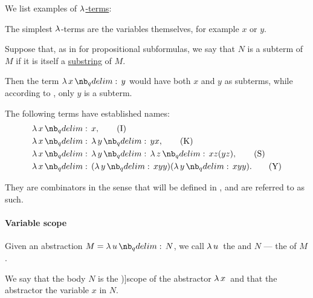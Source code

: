 \begin{example}\label{ex:def:untyped_lambda_term}
  We list examples of \hyperref[def:untyped_lambda_term]{\( \mathrm{\lambda} \)-terms}:
  \begin{thmenum}
     The simplest \( \mathrm{\lambda} \)-terms are the variables themselves, for example \( x \) or \( y \).

     Suppose that, as in  for propositional subformulas, we say that \( N \) is a subterm of \( M \) if it is itself a \hyperref[def:formal_language/substring]{substring} of \( M \).

    Then the term \( \qabs x y \) would have both \( x \) and \( y \) as subterms, while according to , only \( y \) is a subterm.

     The following terms have established names:
    \begin{align}
      &\qabs x x, \label{eq:ex:def:untyped_lambda_term/combinator/i}\tag{I} \\
      &\qabs x \qabs y yx, \nonumber\label{eq:ex:def:untyped_lambda_term/combinator/k}\tag{K} \\
      &\qabs x \qabs y \qabs z xz(yz), \label{eq:ex:def:untyped_lambda_term/combinator/s}\tag{S} \\
      &\qabs x (\qabs y xyy) (\qabs y xyy). \label{eq:ex:def:untyped_lambda_term/combinator/y}\tag{Y}
    \end{align}

    They are combinators in the sense that will be defined in , and are referred to as such.
  \end{thmenum}
\end{example}

\paragraph{Variable scope}

\begin{definition}\label{def:lambda_abstractor}
  Given an abstraction \( M = \qabs u N \), we call \( \qabs* u \) the  and \( N \) --- the  of \( M \).

  We say that the body \( N \) is the \term[ru=область действия (\cite[64]{Герасимов2011})]{scope} of the abstractor \( \quantifier* \synlambda x \) and that the abstractor  the variable \( x \) in \( N \).
\end{definition}

